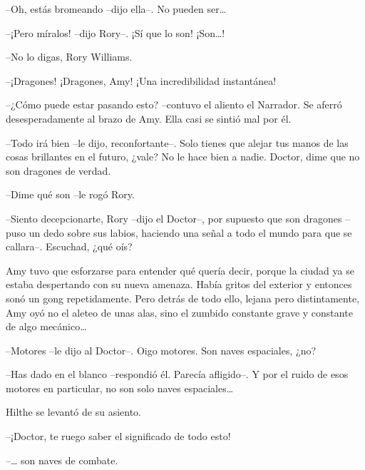 {--Oh, estás bromeando --dijo ella--. No pueden ser\ldots{}}

{--¡Pero míralos! --dijo Rory--. ¡Sí que lo son! ¡Son\ldots{}!}

{--No lo digas, Rory Williams.}

{--¡Dragones! ¡Dragones, Amy! ¡Una incredibilidad instantánea!}

{--¿Cómo puede estar pasando esto? --contuvo el aliento el Narrador.
	Se aferró desesperadamente al brazo de Amy. Ella casi se sintió mal por
él.}

{--Todo irá bien --le dijo, reconfortante--. Solo tienes que alejar
	tus manos de las cosas brillantes en el futuro, ¿vale? No le hace bien a
nadie. Doctor, dime que no son dragones de verdad.}

{--Dime qué son --le rogó Rory.}

{--Siento decepcionarte, Rory --dijo el Doctor--, por supuesto que son
	dragones --puso un dedo sobre sus labios, haciendo una señal a todo el
mundo para que se callara--. Escuchad, ¿qué oís?}

{Amy tuvo que esforzarse para entender qué quería decir, porque la
	ciudad ya se estaba despertando con su nueva amenaza. Había gritos del
	exterior y entonces sonó un gong repetidamente. Pero detrás de todo
	ello, lejana pero distintamente, Amy oyó no el aleteo de unas alas, sino
	el zumbido constante grave y constante de algo mecánico\ldots{}}

{--Motores --le dijo al Doctor--. Oigo motores. Son naves espaciales,
¿no?}

{--Has dado en el blanco --respondió él. Parecía afligido--. Y por el
	ruido de esos motores en particular, no son solo naves
	espaciales\ldots{}}

{Hilthe se levantó de su asiento.}

{--¡Doctor, te ruego saber el significado de todo esto!}

{--\ldots{} }{son naves de combate.}
